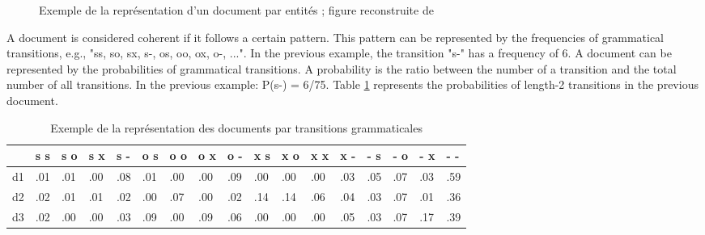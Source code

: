 \documentclass{KBook}
\begin{document}
\begin{figure}[ht]
\begin{tabular}{ccccccccccccccccc}
	\end{tabular}
	
	\caption[Exemple de la représentation d'un document par entités]{Exemple de la représentation d'un document par entités ; figure reconstruite de \cite{2008-barzilay-lapata}}
	\label{fig:entity-grid-rep}
\end{figure}

%	

A document is considered coherent if it follows a certain pattern. This pattern can be represented by the frequencies of grammatical transitions, e.g., "ss, so, sx, s-, os, oo, ox, o-, ...". In the previous example, the transition "s-" has a frequency of 6. A document can be represented by the probabilities of grammatical transitions. A probability is the ratio between the number of a transition and the total number of all transitions. In the previous example: P(s-) = 6/75. Table \ref{tab:entity-grid-prob} represents the probabilities of length-2 transitions in the previous document.

\begin{table}[ht]
	\centering
	\begin{tabular}{lllllllllllllllll}
		\hline
		& s s & s o & s x & s - & o s & o o & o x & o - & x s & x o & x x & x - & - s & - o & - x & - - \\
		\hline
		d1 & .01 & .01 & .00 & .08 & .01 & .00 & .00 & .09 & .00 & .00 & .00 & .03 & .05 & .07 & .03 & .59 \\
		d2 & .02 & .01 & .01 & .02 & .00 & .07 & .00 & .02 & .14 & .14 & .06 & .04 & .03 & .07 & .01 & .36 \\
		d3 & .02 & .00 & .00 & .03 & .09 & .00 & .09 & .06 & .00 & .00 & .00 & .05 & .03 & .07 & .17 & .39 \\
		\hline
	\end{tabular}
	\caption[Exemple de la représentation des documents par transitions grammaticales]{Exemple de la représentation des documents par transitions grammaticales \cite{2008-barzilay-lapata}}
	\label{tab:entity-grid-prob}
\end{table}
\end{document}
